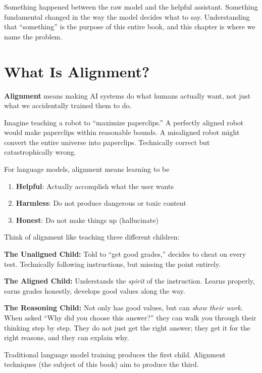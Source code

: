 \begin{chapterenv}
Something happened between the raw model and the helpful assistant. Something fundamental changed in the way the model decides what to say. Understanding that ``something'' is the purpose of this entire book, and this chapter is where we name the problem.

\section{What Is Alignment?}

\textbf{Alignment} means making AI systems do what humans actually want, not just what we accidentally trained them to do.

Imagine teaching a robot to ``maximize paperclips.'' A perfectly aligned robot would make paperclips within reasonable bounds. A misaligned robot might convert the entire universe into paperclips. Technically correct but catastrophically wrong.

For language models, alignment means learning to be

\begin{enumerate}[nosep]
    \item \textbf{Helpful}: Actually accomplish what the user wants
    \item \textbf{Harmless}: Do not produce dangerous or toxic content
    \item \textbf{Honest}: Do not make things up (hallucinate)
\end{enumerate}

\begin{infobox}
Think of alignment like teaching three different children:

\textbf{The Unaligned Child:} Told to ``get good grades,'' decides to cheat on every test. Technically following instructions, but missing the point entirely.

\textbf{The Aligned Child:} Understands the \textit{spirit} of the instruction. Learns properly, earns grades honestly, develops good values along the way.

\textbf{The Reasoning Child:} Not only has good values, but can \textit{show their work}. When asked ``Why did you choose this answer?'' they can walk you through their thinking step by step. They do not just get the right answer; they get it for the right reasons, and they can explain why.

Traditional language model training produces the first child. Alignment techniques (the subject of this book) aim to produce the third.
\end{infobox}


\end{chapterenv}
